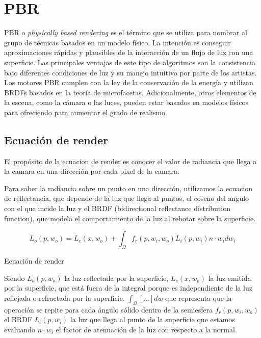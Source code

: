 \chapter{PBR}
PBR o \textit{physically based rendering} es el t\'ermino que se utiliza para nombrar al grupo de t\'ecnicas basados en un
modelo f\'isico. La intenci\'on es conseguir aproximaciones r\'apidas y plausibles de la interacci\'on de un flujo de luz
con una superficie. Las principales ventajas de este tipo de algoritmos son la consistencia bajo diferentes condiciones de
luz y su manejo intuitivo por parte de los artistas.
Los motores PBR cumplen con la ley de la conservaci\'on de la energ\'ia y utilizan BRDFs basados en la teor\'ia de
microfacetas. Adicionalmente, otros elementos de la escena, como la c\'amara o las luces, pueden estar basados en modelos
f\'isicos para ofreciendo para aumentar el grado de realismo.

\section{Ecuaci\'on de render}
El prop\'osito de la ecuacion de render es conocer el valor de radiancia que llega a la camara en una direcci\'on
por cada pixel  de la camara.

Para saber la radiancia sobre un punto en una direcci\'on, utilizamos la ecuacion de reflectancia, que depende
de la luz que llega al puntos, el coseno del angulo con el que incide la luz y el BRDF (bidirectional reflectance
distribution function), que modela el comportamiento de la luz al rebotar sobre la superficie.\\

\begin{eqfloat}[!htb]
    \begin{equation}
        L_o(p, w_o) = L_e(x, w_o) + \int_\Omega{f_r(p, w_i, w_o) L_i(p, w_i) n\cdot{w_i}dw_i}
    \end{equation}
  \caption{Ecuaci\'on de render}
\end{eqfloat}
\singlespacing

Siendo $L_o(p, w_o)$ la luz reflectada por la superficie, $L_e(x, w_o)$ la luz emitida por la superficie, que est\'a fuera
de la integral porque es independiente de la luz reflejada o refractada por la superficie. $\int_{\Omega}[...]dw$ que representa
que la operaci\'on se repite para cada \'angulo s\'olido dentro de la semiesfera $f_r(p, w_i, w_o)$ el BRDF $L_i(p, w_i)$ la luz
que llega al punto de la superficie que estamos evaluando $n\cdot{w_i}$ el factor de atenuaci\'on de la luz con respecto a la normal.

